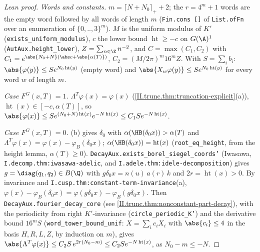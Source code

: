 \begin{proof}[Lean proof]
\emph{Words and constants.} $m=\lceil N+N_0\rceil_++2$; the $r=4^m+1$ words are the empty word followed by all words of length $m$ (\texttt{Fin.cons []} of \texttt{List.ofFn} over an enumeration of $\{0,..,3\}^m$). $M$ is the uniform modulus of $K'$ (\texttt{exists\_uniform\_modulus}), $c$ the lower bound $\operatorname{ht}\ge-c$ on $G(\A)^1$ (\texttt{AutAux.height\_lower}), $Z=\sum_{n\in\Z}n^{-2}$, and $C=\max(C_1,C_2)$ with $C_1=e^{\abs{N_0+N}(\abs c+\abs{\alpha(T)})}$, $C_2=(M/2\pi)^m16^mZ$. With $S=\sum_ib_i$: $\abs{\varphi(y)}\le Se^{N_0\operatorname{ht}(y)}$ (empty word) and $\abs{X_w\varphi(y)}\le Se^{N_0\operatorname{ht}(y)}$ for every word $w$ of length $m$.

\emph{Case $F^G(x,T)=1$.} $\Lambda^T\varphi(x)=\varphi(x)$ (\cref{II.trunc.thm:truncation-explicit}(a)), $\operatorname{ht}(x)\in[-c,\alpha(T)]$, so $\abs{\varphi(x)}\le Se^{(N_0+N)\operatorname{ht}(x)}e^{-N\operatorname{ht}(x)}\le C_1Se^{-N\operatorname{ht}(x)}$.

\emph{Case $F^G(x,T)=0$.} (b) gives $\delta_0$ with $\alpha(\HB(\delta_0x))>\alpha(T)$ and $\Lambda^T\varphi(x)=\varphi(x)-\varphi_B(\delta_0x)$; $\alpha(\HB(\delta_0x))=\operatorname{ht}(x)$ (\texttt{root\_eq\_height}, from the height lemma, $\alpha(T)\ge0$). \texttt{DecayAux.exists\_borel\_siegel\_coords'} (Iwasawa, \texttt{I.decomp.thm:iwasawa-adelic}, and \texttt{I.adele.thm:idele-decomposition}) gives $g=\diag(q_1,q_2)\in B(\Q)$ with $g\delta_0x=n(u)\,a(r)\,k$ and $2r=\operatorname{ht}(x)>0$. By invariance and \texttt{I.cusp.thm:constant-term-invariance}(a), $\varphi(x)-\varphi_B(\delta_0x)=\varphi(g\delta_0x)-\varphi_B(g\delta_0x)$. Then \texttt{DecayAux.fourier\_decay\_core} (see \cref{II.trunc.thm:nonconstant-part-decay}), with the periodicity from right $K'$-invariance (\texttt{circle\_periodic\_K'}) and the derivative bound $16^mS$ (\texttt{word\_tower\_bound\_unif}: $X=\sum_ic_iX_i$ with $\abs{c_i}\le4$ in the basis $H,R,L,Z$, by induction on $m$), gives $\abs{\Lambda^T\varphi(x)}\le C_2S\,e^{2r(N_0-m)}\le C_2Se^{-N\operatorname{ht}(x)}$, as $N_0-m\le-N$.
\end{proof}

